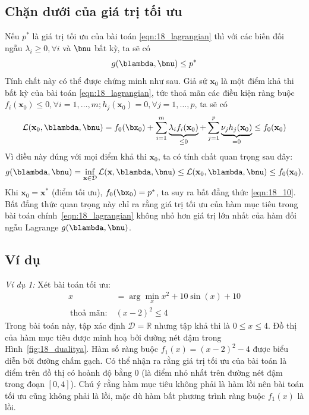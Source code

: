  
 
\subsection{Chặn dưới của giá trị tối ưu }
Nếu $p^*$ là giá trị tối ưu của bài toán
\eqref{eqn:18_lagrangian} thì với các biến đối ngẫu $\lambda_i \geq 0, \forall
i$ và $\bnu$ {bất kỳ}, ta sẽ có
\begin{equation} 
\label{eqn:18_10}
g(\blambda, \bnu) \leq p^*
\end{equation} 
Tính chất này có thể được chứng minh như sau. Giả sử $\mathbf{x}_0$ là một
điểm khả thi bất kỳ của bài toán \eqref{eqn:18_lagrangian}, tức
thoả mãn các điều kiện ràng buộc $f_i(\mathbf{x}_0) \leq 0, \forall i = 1,
\dots, m; h_j(\mathbf{x}_0) = 0, \forall j = 1, \dots, p$, ta sẽ có
\begin{equation*} 
\mathcal{L}(\mathbf{x}_0, \blambda, \bnu) = f_0(\bx_0) + \sum_{i=1}^m
\underbrace{\lambda_if_i(\mathbf{x}_0)}_{\leq 0}+ \sum_{j=1}^p \underbrace{\nu_j
h_j(\mathbf{x}_0)}_{= 0} \leq f_0(\mathbf{x}_0)
\end{equation*} 
Vì điều này đúng với mọi điểm khả thi $\mathbf{x}_0$, ta có tính chất quan trọng sau đây:  
\begin{equation*} 
g(\blambda, \bnu) = \inf_{\mathbf{x} \in \mathcal{D}} \mathcal{L}(\mathbf{x}, \blambda, \bnu) \leq \mathcal{L}(\mathbf{x}_0, \blambda, \bnu) \leq f_0(\mathbf{x}_0). 
\end{equation*} 
Khi $\mathbf{x}_0 = \mathbf{x}^*$ (điểm tối ưu), $f_0(\bx_0) = p^*$, ta suy ra
bất đẳng thức \eqref{eqn:18_10}. 
Bất đẳng thức quan trọng này chỉ ra rằng giá trị tối ưu của hàm mục tiêu trong
bài toán chính~\eqref{eqn:18_lagrangian} không nhỏ hơn giá trị lớn nhất của hàm
đối
ngẫu Lagrange $g(\blambda, \bnu)$. 

 \subsection{Ví dụ }
 
\textit{Ví dụ 1:} Xét bài toán tối ưu:
\begin{equation} 
\begin{aligned}
    x&= \arg\min_{x} x^2 + 10\sin(x) + 10 \\\ 
    \text{thoả mãn:}~& (x-2)^2 \leq 4  
\end{aligned}
\end{equation} 
Trong bài toán này, tập xác định $\mathcal{D} = \mathbb{R}$ nhưng
tập khả thi là $0 \leq x \leq 4$. Đồ thị của hàm mục tiêu được minh
hoạ bởi đường nét đậm trong Hình~\ref{fig:18_dualitya}. Hàm số ràng buộc
$f_1(x) = (x-2)^2 - 4$ được biểu diễn bởi đường chấm gạch. Có thể nhận ra rằng giá trị tối ưu
của bài toán là điểm trên đồ thị có hoành độ bằng 0 (là
điểm nhỏ nhất trên đường nét đậm trong đoạn $[0, 4]$). Chú ý rằng hàm mục tiêu không phải là hàm lồi nên bài toán tối ưu cũng
không phải là lồi, mặc dù hàm bất phương trình ràng buộc $f_1(x)$ là lồi.
 
